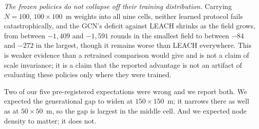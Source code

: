 \emph{The frozen policies do not collapse off their training distribution.}
Carrying $N = 100$, $100\times100$~m weights into all nine cells, neither
learned protocol fails catastrophically, and the GCN's deficit against LEACH
shrinks as the field grows, from between $-1{,}409$ and $-1{,}591$ rounds in the
smallest field to between $-84$ and $-272$ in the largest, though it remains
worse than LEACH everywhere. This is weaker evidence than a retrained comparison
would give and is not a claim of scale invariance; it is a claim that the
reported advantage is not an artifact of evaluating these policies only where
they were trained.

Two of our five pre-registered expectations were wrong and we report both. We
expected the generational gap to widen at $150\times150$~m; it narrows there as
well as at $50\times50$~m, so the gap is largest in the middle cell. And we
expected node density to matter; it does not.
